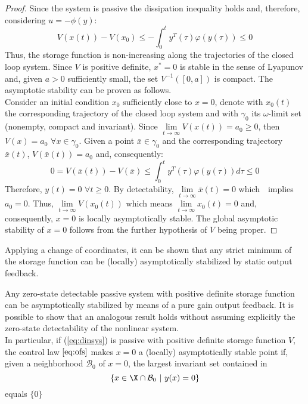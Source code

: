 %
\begin{proof}
	Since the system is passive the dissipation inequality holds and, therefore, considering $u=-\phi(y)$:
	\begin{equation*}
	V(x(t))-V(x_0)\leq-\int_{0}^{t}y^T(\tau)\varphi(y(\tau))\leq 0
	\end{equation*}
	Thus, the storage function is non-increasing along the trajectories of the closed loop system. Since $V$ is positive definite, $x^*=0$ is stable in the sense of Lyapunov and, given $a>0$ sufficiently small, the set $V^{-1}([0,a])$ is compact. The asymptotic stability can be proven as follows.\\
	Consider an initial condition $x_0$ sufficiently close to $x=0$, denote with $x_0(t)$ the corresponding trajectory of the closed loop system and with $\gamma_0$ its $\omega$-limit set (nonempty, compact and invariant). Since $\lim\limits_{t\rightarrow\infty}V(x(t))=a_0\geq 0$, then $V(x)=a_0$ $\forall x\in\gamma_0$. Given a point $\bar{x}\in\gamma_0$ and the corresponding trajectory $\bar{x}(t)$, $V(\bar{x}(t))=a_0$ and, consequently:
	\begin{equation*}
		0=V(\bar{x}(t))-V(\bar{x})\leq\int_{0}^{t}y^T(\tau)\varphi(y(\tau))d\tau\leq 0
	\end{equation*} 
	Therefore, $y(t)=0$ $\forall t\geq 0$. By detectability, $\lim\limits_{t\rightarrow\infty}\bar{x}(t)=0$ which　implies $a_0=0$. Thus, $\lim\limits_{t\rightarrow\infty}V(x_0(t))$ which means $\lim\limits_{t\rightarrow\infty}x_0(t)=0$ and, consequently, $x=0$ is locally asymptotically stable. The global asymptotic stability of $x=0$ follows from the further hypothesis of $V$ being proper.
\end{proof}
%
\begin{note}
	Applying a change of coordinates, it can be shown that any strict minimum of the storage function can be (locally) asymptotically stabilized by static output feedback.
\end{note}
%
\begin{note}
	Any zero-state detectable passive system with positive definite storage function can be asymptotically stabilized by means of a pure gain output feedback.
	It is possible to show that an analogous result holds without assuming explicitly the zero-state detectability of the nonlinear system.\\
	In particular, if (\ref{eq:dinsys}) is passive with positive definite storage function $V$, the control law $\ref{eq:ofs}$ makes $x=0$ a (locally) asymptotically stable point if, given a neighborhood $\mathcal{B}_0$ of $x=0$, the largest invariant set contained in
	\begin{equation*}
		\left\{x\in\X\cap\mathcal{B}_0\text{ }|\text{ }y(x)=0\right\}
	\end{equation*}
	equals $\{0\}$
\end{note}
